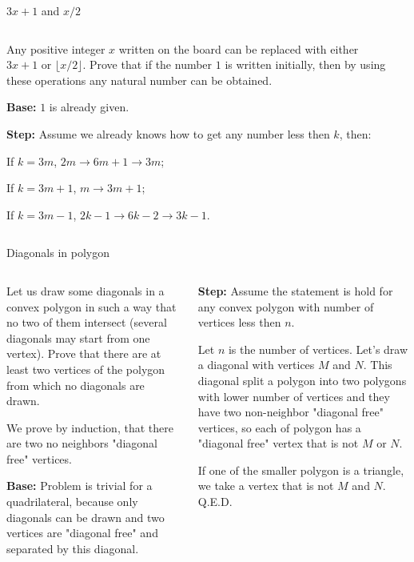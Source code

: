 \documentclass[9pt,aspectratio=169]{beamer}
\begin{document}
\begin{frame}{$3x+1$ and $x/2$}
  \begin{columns}[T]
    \begin{column}{0.5\textwidth}
      \begin{problem}
        Any positive integer $x$ written on the board can be replaced with either $3x+1$ or $\lfloor x/2 \rfloor$. Prove that if the number $1$ is written initially, then by using these operations any natural number can be obtained.
      \end{problem}\pause
      
      \textbf{Base:} $1$ is already given.\pause

      \textbf{Step:} Assume we already knows how to get any number less then $k$, then:

      If $k = 3m$, $2m \to 6m + 1 \to 3m$;\pause
      
      If $k = 3m + 1$, $m \to 3m + 1$;\pause

      If $k = 3m - 1$, $2k - 1 \to 6k - 2 \to 3k - 1$.\pause

    \end{column}
    \begin{column}{0.5\textwidth}
    \end{column}
  \end{columns}
\end{frame}

\begin{frame}{Diagonals in polygon}
  \begin{columns}[T]
    \begin{column}{0.5\textwidth}
      \begin{problem}
        Let us draw some diagonals in a convex polygon in such a way that no two of them intersect (several diagonals may start from one vertex). Prove that there are at least two vertices of the polygon from which no diagonals are drawn.
      \end{problem}\pause

      We prove by induction, that there are two no neighbors "diagonal free" vertices.

      \textbf{Base:} Problem is trivial for a quadrilateral, because only diagonals can be drawn and two vertices are "diagonal free" and separated by this diagonal.\pause

    \end{column}
    \begin{column}{0.5\textwidth}
      \textbf{Step:} Assume the statement is hold for any convex polygon with number of vertices less then $n$.\pause

      Let $n$ is the number of vertices. Let's draw a diagonal with vertices $M$ and $N$. This diagonal split a polygon into two polygons with lower number of vertices and they have two non-neighbor "diagonal free" vertices, so each of polygon has a "diagonal free" vertex that is not $M$ or $N$.\pause

      If one of the smaller polygon is a triangle, we take a vertex that is not $M$ and $N$. \hfill Q.E.D. 
    \end{column}
  \end{columns}
\end{frame}
\end{document}
